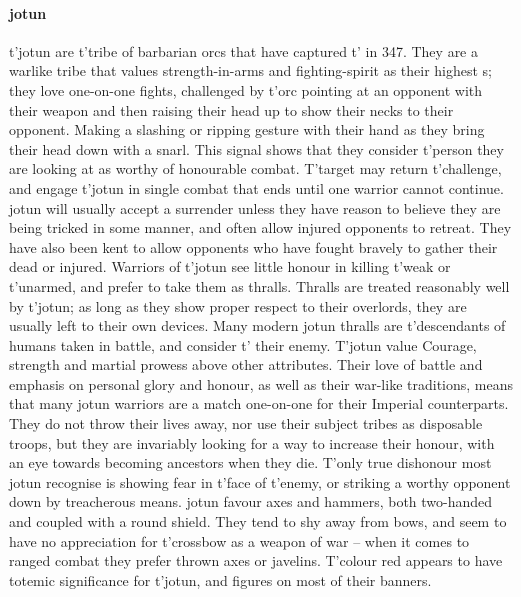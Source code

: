 \paragraph{jotun} t'\allowbreak jotun are t'\allowbreak tribe of barbarian orcs that have captured t'\allowbreak {} in 347. They are a warlike tribe that values strength-in-arms and fighting-spirit as their highest s; they love one-on-one fights, challenged by t'\allowbreak orc pointing at an opponent with their weapon and then raising their head up to show their necks to their opponent. Making a slashing or ripping gesture with their hand as they bring their head down with a snarl. This signal shows that they consider t'\allowbreak person they are looking at as worthy of honourable combat. T'target may return t'\allowbreak challenge, and engage t'\allowbreak jotun in single combat that ends until one warrior cannot continue. jotun will usually accept a surrender unless they have reason to believe they are being tricked in some manner, and often allow injured opponents to retreat. They have also been kent to allow opponents who have fought bravely to gather their dead or injured. Warriors of t'\allowbreak jotun see little honour in killing t'\allowbreak weak or t'\allowbreak unarmed, and prefer to take them as thralls. Thralls are treated reasonably well by t'\allowbreak jotun; as long as they show proper respect to their overlords, they are usually left to their own devices. Many modern jotun thralls are t'\allowbreak descendants of humans taken in battle, and consider t'\allowbreak {} their enemy. T'jotun value Courage, strength and martial prowess above other attributes. Their love of battle and emphasis on personal glory and honour, as well as their war-like traditions, means that many jotun warriors are a match one-on-one for their Imperial counterparts. They do not throw their lives away, nor use their subject tribes as disposable troops, but they are invariably looking for a way to increase their honour, with an eye towards becoming ancestors when they die. T'only true dishonour most jotun recognise is showing fear in t'\allowbreak face of t'\allowbreak enemy, or striking a worthy opponent down by treacherous means. jotun favour axes and hammers, both two-handed and coupled with a round shield. They tend to shy away from bows, and seem to have no appreciation for t'\allowbreak crossbow as a weapon of war – when it comes to ranged combat they prefer thrown axes or javelins. T'colour red appears to have totemic significance for t'\allowbreak jotun, and figures on most of their banners. 
